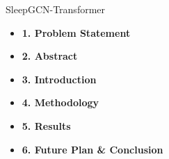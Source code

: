 \documentclass [aspectratio=169]{beamer}
\begin{document}









\begin{frame}{SleepGCN-Transformer}

    \begin{block}{}
        \begin{itemize}
        	\item \textbf{1. Problem Statement}
            \item \textbf{2. Abstract}
            \item \textbf{3. Introduction}
            \item \textbf{4. Methodology}
            \item \textbf{5. Results}
            \item \textbf{6. Future Plan \& Conclusion}
        \end{itemize}
    \end{block}
\end{frame}

    
        
        
 


\end{document}
